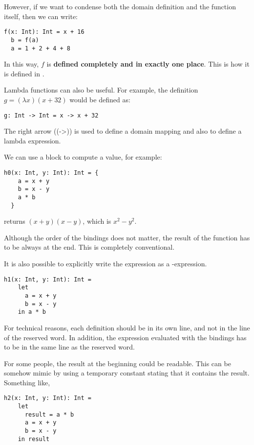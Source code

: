 However, if we want to condense both the domain definition and the function itself, then we can write:
\begin{lstlisting}[label={lst:exampleFunctionDefinition}]
  f(x: Int): Int = x + 16
  b = f(a)
  a = 1 + 2 + 4 + 8
\end{lstlisting}

In this way, $f$ is \textbf{defined completely and in exactly one place}.
This is how it is defined in \Soda.

Lambda functions can also be useful.
For example, the definition
$g = (\lambda x)(x + 32)$
would be defined as:
\begin{lstlisting}[label={lst:exampleFunctionDefinitionWithLambda}]
  g: Int -> Int = x -> x + 32
\end{lstlisting}

The right arrow (\srccode(->)) is used to define a domain mapping and also to define a lambda expression.


We can use a block to compute a value, for example:
\begin{lstlisting}[label={lst:exampleFunctionDefinitionWithBraces}]
  h0(x: Int, y: Int): Int = {
    a = x + y
    b = x - y
    a * b
  }
\end{lstlisting}
returns $(x + y)(x - y)$, which is $x^{2} - y^{2}$.

Although the order of the bindings does not matter, the result of the function has to be always at the end.
This is completely conventional.

It is also possible to explicitly write the expression as a \slet-\sdin expression.
\begin{lstlisting}[label={lst:exampleFunctionDefinitionWithLetIn}]
  h1(x: Int, y: Int): Int =
    let
      a = x + y
      b = x - y
    in a * b
\end{lstlisting}

For technical reasons, each definition should be in its own line, and not in the line of the \slet reserved word.
In addition, the expression evaluated with the bindings has to be in the same line as the \sdin reserved word.

For some people, the result at the beginning could be readable.
This can be somehow mimic by using a temporary constant stating that it contains the result.
Something like,
\begin{lstlisting}[label={lst:exampleFunctionDefinitionWithBlockAndResult}]
  h2(x: Int, y: Int): Int =
    let
      result = a * b
      a = x + y
      b = x - y
    in result
\end{lstlisting}

